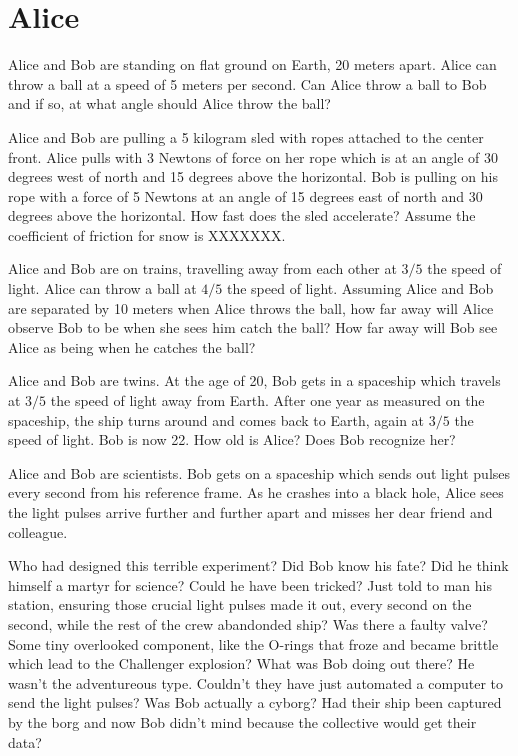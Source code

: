 
\chapter*{Alice}

Alice and Bob are standing on flat ground on Earth, 20 meters apart. Alice can throw a ball at a speed of 5 meters per second. Can Alice throw a ball to Bob and if so, at what angle should Alice throw the ball?

Alice and Bob are pulling a 5 kilogram sled with ropes attached to the center front. Alice pulls with 3 Newtons of force on her rope which is at an angle of 30 degrees west of north and 15 degrees above the horizontal. Bob is pulling on his rope with a force of 5 Newtons at an angle of 15 degrees east of north and 30 degrees above the horizontal. How fast does the sled accelerate? Assume the coefficient of friction for snow is XXXXXXX. 

Alice and Bob are on trains, travelling away from each other at $3/5$ the speed of light. Alice can throw a ball at $4/5$ the speed of light. Assuming Alice and Bob are separated by 10 meters when Alice throws the ball, how far away will Alice observe Bob to be when she sees him catch the ball? How far away will Bob see Alice as being when he catches the ball?

Alice and Bob are twins. At the age of 20, Bob gets in a spaceship which travels at $3/5$ the speed of light away from Earth. After one year as measured on the spaceship, the ship turns around and comes back to Earth, again at $3/5$ the speed of light. Bob is now 22. How old is Alice? Does Bob recognize her?

Alice and Bob are scientists. Bob gets on a spaceship which sends out light pulses every second from his reference frame. As he crashes into a black hole, Alice sees the light pulses arrive further and further apart and misses her dear friend and colleague.

Who had designed this terrible experiment? Did Bob know his fate? Did he think himself a martyr for science? Could he have been tricked? Just told to man his station, ensuring those crucial light pulses made it out, every second on the second, while the rest of the crew abandonded ship? Was there a faulty valve? Some tiny overlooked component, like the O-rings that froze and became brittle which lead to the Challenger explosion? What was Bob doing out there? He wasn't the adventureous type. Couldn't they have just automated a computer to send the light pulses? Was Bob actually a cyborg? Had their ship been captured by the borg and now Bob didn't mind because the collective would get their data?

